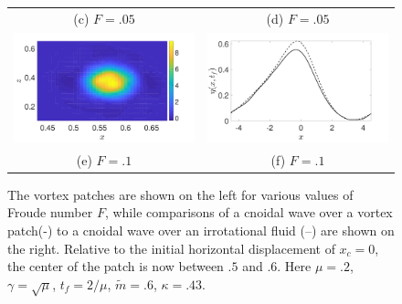 \documentclass[a4paper,11pt]{article}
\begin{document}
\begin{figure}
\begin{tabular}{cc}
(c)  $F=.05$ & (d)  $F=.05$\\
\includegraphics[width=.45\textwidth]{vorticity_wm_10_modu_pt6} & \includegraphics[width=.45\textwidth]{profiles_wm_10_modu_pt6}\\
(e)  $F=.1$ & (f)  $F=.1$
\end{tabular}
\caption{The vortex patches are shown on the left for various values of Froude number $F$, while comparisons of a cnoidal wave over a vortex patch(-) to a cnoidal wave over an irrotational fluid (--) are shown on the right.  Relative to the initial horizontal displacement of $x_{c}=0$, the center of the patch is now between $.5$ and $.6$.  Here $\mu=.2$, $\gamma=\sqrt{\mu}$, $t_{f}=2/\mu$, $\tilde{m}=.6$, $\kappa = .43$.}
\label{fig:midsolwave}
\end{figure}
\end{document}
